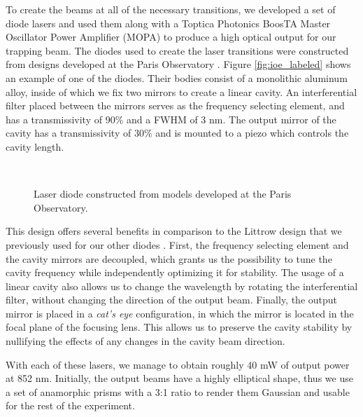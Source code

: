To create the beams at all of the necessary transitions, we developed a set of diode lasers and used them along with a Toptica Photonics BoosTA Master Oscillator Power Amplifier (MOPA) to produce a high optical output for our trapping beam.  The diodes used to create the laser transitions were constructed from designs
developed at the Paris Observatory \cite{Baillard06}.  Figure
\ref{fig:ioe_labeled} shows an example of one of the diodes.  Their bodies consist of a monolithic aluminum alloy, inside of which we fix two mirrors to create a linear cavity.  An interferential filter placed between the mirrors serves as the frequency selecting element, and has a transmissivity of 90\% and a FWHM of 3 nm.  The output mirror of the cavity has a transmissivity of 30\% and is mounted to a piezo which controls the cavity length.


\begin{figure}[!ht]
  \centering
   \\
  \caption[Laser diode]{Laser diode constructed from models developed at the Paris Observatory.}
  \label{fig:diode_lucy}
\end{figure}

 
This design offers several benefits in comparison to the Littrow design that we previously used for our other diodes \cite{ortalo}.  First, the frequency selecting element and the cavity mirrors are decoupled, which grants us the possibility to tune the cavity frequency while independently optimizing it for stability.  The usage of a linear cavity also allows us to change the wavelength by rotating the interferential filter, without changing the direction of the output beam.  Finally, the output mirror is placed in a \emph{cat's eye} configuration, in which the mirror is located in the focal plane of the focusing lens.  This allows us to preserve the cavity stability by nullifying the effects of any changes in the cavity beam direction.

With each of these lasers, we manage to obtain roughly 40 mW of output power at 852 nm.  Initially, the output beams have a highly elliptical shape, thus we use a set of anamorphic prisms with a 3:1 ratio to render them Gaussian and usable for the rest of the experiment.

